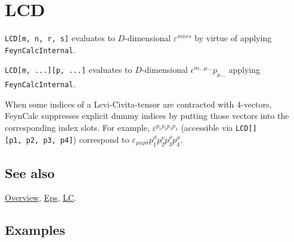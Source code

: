 \documentclass[../FeynCalcManual.tex]{subfiles}
\begin{document}
\begin{Shaded}
\begin{Highlighting}[]
 
\end{Highlighting}
\end{Shaded}

\hypertarget{lcd}{
\section{LCD}\label{lcd}}

\texttt{LCD[\allowbreak{}m,\ \allowbreak{}n,\ \allowbreak{}r,\ \allowbreak{}s]}
evaluates to \(D\)-dimensional \(\varepsilon^{m n r s}\) by virtue of
applying \texttt{FeynCalcInternal}.

\texttt{LCD[\allowbreak{}m,\ \allowbreak{}...][\allowbreak{}p,\ \allowbreak{}...]}
evaluates to \(D\)-dimensional
\(\epsilon ^{m \ldots \mu \ldots}p_{\mu \ldots}\) applying
\texttt{FeynCalcInternal}.

When some indices of a Levi-Civita-tensor are contracted with 4-vectors,
FeynCalc suppresses explicit dummy indices by putting those vectors into
the corresponding index slots. For example,
\(\varepsilon^{p_1 p_2 p_3 p_4}\) (accessible via
\texttt{LCD[\allowbreak{}][\allowbreak{}p1,\ \allowbreak{}p2,\ \allowbreak{}p3,\ \allowbreak{}p4]})
correspond to
\(\varepsilon_{\mu \nu \rho \sigma} p_1^\mu p_2^\nu p_3^\rho p_4^\sigma\).

\subsection{See also}

\hyperlink{toc}{Overview}, \hyperlink{eps}{Eps}, \hyperlink{lc}{LC}.

\subsection{Examples}

\begin{Shaded}
\begin{Highlighting}[]
\OperatorTok{[}\SpecialCharTok{\textbackslash{}}\OperatorTok{[}\OperatorTok{],} \SpecialCharTok{\textbackslash{}}\OperatorTok{[}\OperatorTok{],} \SpecialCharTok{\textbackslash{}}\OperatorTok{[}\OperatorTok{],} \SpecialCharTok{\textbackslash{}}\OperatorTok{[}\OperatorTok{]]}
\end{Highlighting}
\end{Shaded}
\end{document}
